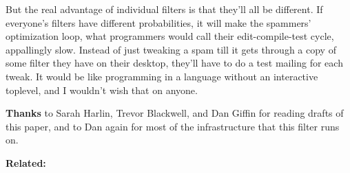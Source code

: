 But the real advantage of individual filters is that they'll all be
different. If everyone's filters have different probabilities, it will
make the spammers' optimization loop, what programmers would call their
edit-compile-test cycle, appallingly slow. Instead of just tweaking a
spam till it gets through a copy of some filter they have on their
desktop, they'll have to do a test mailing for each tweak. It would be
like programming in a language without an interactive toplevel, and I
wouldn't wish that on anyone.


\textbf{Thanks} to Sarah Harlin, Trevor Blackwell, and Dan Giffin for
reading drafts of this paper, and to Dan again for most of the
infrastructure that this filter runs on.

\textbf{Related:}